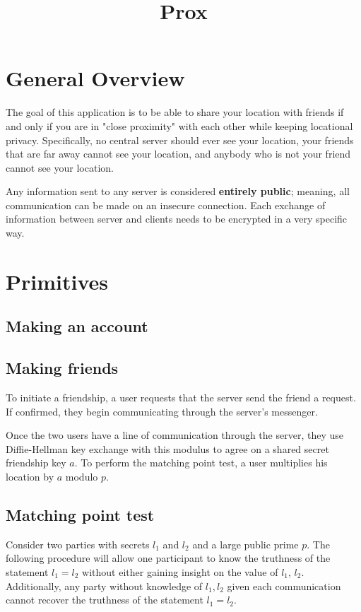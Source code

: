 \documentclass{article}
\begin{document}
\title{Prox}
\maketitle

\section{General Overview}
The goal of this application is to be able to share your location with friends if and only if you are in "close proximity" with each other while keeping locational privacy. Specifically, no central server should ever see your location, your friends that are far away cannot see your location, and anybody who is not your friend cannot see your location.

Any information sent to any server is considered \textbf{entirely public}; meaning, all communication can be made on an insecure connection. Each exchange of information between server and clients needs to be encrypted in a very specific way.

\section{Primitives}

\subsection{Making an account}


\subsection{Making friends}
To initiate a friendship, a user requests that the server send the friend a request. If confirmed, they begin communicating through the server's messenger.

Once the two users have a line of communication through the server, they use Diffie-Hellman key exchange with this modulus to agree on a shared secret friendship key $a$. To perform the matching point test, a user multiplies his location by $a$ modulo $p$.

\subsection{Matching point test}

Consider two parties with secrets $l_1$ and $l_2$ and a large public prime $p$.
The following procedure will allow one participant to know the truthness of the statement $l_1 = l_2$ without either gaining insight on the value of $l_1$, $l_2$. Additionally, any party without knowledge of $l_1, l_2$ given each communication cannot recover the truthness of the statement $l_1 = l_2$.
\end{document}
